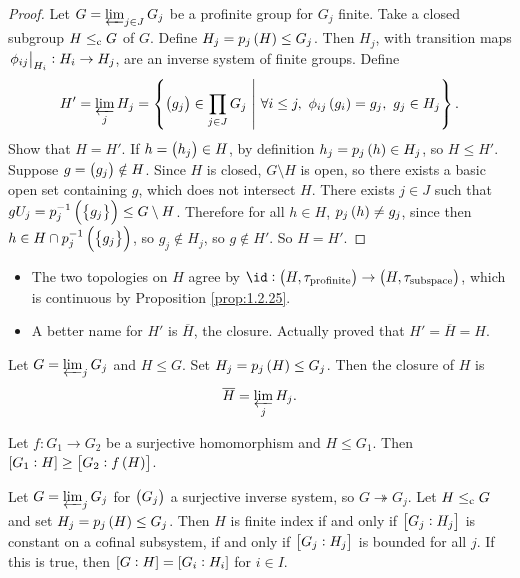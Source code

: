 \begin{proof}
Let $ G = \varprojlim_{j \in J} G_j $ be a profinite group for $ G_j $ finite. Take a closed subgroup $ H \le_{\mathrm{c}} G $ of $ G $. Define $ H_j = p_j\br{H} \le G_j $. Then $ H_j $, with transition maps $ \left. \phi_{ij} \right|_{H_i} : H_i \to H_j $, are an inverse system of finite groups. Define
$$ H' = \varprojlim_j H_j = \cbr{\br{g_j} \in \prod_{j \in J} G_j \st \forall i \le j, \ \phi_{ij}\br{g_i} = g_j, \ g_j \in H_j}. $$
Show that $ H = H' $. If $ h = \br{h_j} \in H $, by definition $ h_j = p_j\br{h} \in H_j $, so $ H \le H' $. Suppose $ g = \br{g_j} \notin H $. Since $ H $ is closed, $ G \setminus H $ is open, so there exists a basic open set containing $ g $, which does not intersect $ H $. There exists $ j \in J $ such that $ gU_j = p_j^{-1}\br{\cbr{g_j}} \le G \setminus H $. Therefore for all $ h \in H $, $ p_j\br{h} \ne g_j $, since then $ h \in H \cap p_j^{-1}\br{\cbr{g_j}} $, so $ g_j \notin H_j $, so $ g \notin H' $. So $ H = H' $.
\end{proof}

\begin{remark}
\hfill
\begin{itemize}
\item The two topologies on $ H $ agree by $ \id : \br{H, \tau_{\text{profinite}}} \to \br{H, \tau_{\text{subspace}}} $, which is continuous by Proposition \ref{prop:1.2.25}.
\item A better name for $ H' $ is $ \overline{H} $, the closure. Actually proved that $ H' = \overline{H} = H $.
\end{itemize}
\end{remark}

\begin{proposition}
Let $ G = \varprojlim_j G_j $ and $ H \le G $. Set $ H_j = p_j\br{H} \le G_j $. Then the closure of $ H $ is
$$ \overline{H} = \varprojlim_j H_j. $$
\end{proposition}

\begin{lemma}
Let $ f : G_1 \to G_2 $ be a surjective homomorphism and $ H \le G_1 $. Then $ \sbr{G_1 : H} \ge \sbr{G_2 : f\br{H}} $.
\end{lemma}

\begin{proposition}
Let $ G = \varprojlim_j G_j $ for $ \br{G_j} $ a surjective inverse system, so $ G \twoheadrightarrow G_j $. Let $ H \le_{\mathrm{c}} G $ and set $ H_j = p_j\br{H} \le G_j $. Then $ H $ is finite index if and only if $ \sbr{G_j : H_j} $ is constant on a cofinal subsystem, if and only if $ \sbr{G_j : H_j} $ is bounded for all $ j $. If this is true, then $ \sbr{G : H} = \sbr{G_i : H_i} $ for $ i \in I $.
\end{proposition}

